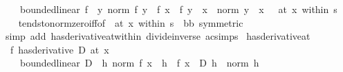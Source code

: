 \begin{isabellebody}
\ \ \ \ bounded{\isacharunderscore}{\kern0pt}linear\ f{\isacharprime}{\kern0pt}\ {\isasymand}\ {\isacharparenleft}{\kern0pt}{\isacharparenleft}{\kern0pt}{\isasymlambda}y{\isachardot}{\kern0pt}\ norm\ {\isacharparenleft}{\kern0pt}{\isacharparenleft}{\kern0pt}f\ y\ {\isacharminus}{\kern0pt}\ f\ x{\isacharparenright}{\kern0pt}\ {\isacharminus}{\kern0pt}\ f{\isacharprime}{\kern0pt}\ {\isacharparenleft}{\kern0pt}y\ {\isacharminus}{\kern0pt}\ x{\isacharparenright}{\kern0pt}{\isacharparenright}{\kern0pt}\ {\isacharslash}{\kern0pt}\ norm\ {\isacharparenleft}{\kern0pt}y\ {\isacharminus}{\kern0pt}\ x{\isacharparenright}{\kern0pt}{\isacharparenright}{\kern0pt}\ {\isasymlonglongrightarrow}\ {}{\isacharparenright}{\kern0pt}\ {\isacharparenleft}{\kern0pt}at\ x\ within\ s{\isacharparenright}{\kern0pt}{\isachardoublequoteclose}\isanewline
%
\isadelimproof
\ \ %
\endisadelimproof
%
\isatagproof
{}\isamarkupfalse%
\ tendsto{\isacharunderscore}{\kern0pt}norm{\isacharunderscore}{\kern0pt}zero{\isacharunderscore}{\kern0pt}iff{\isacharbrackleft}{\kern0pt}of\ {\isacharunderscore}{\kern0pt}\ {\isachardoublequoteopen}at\ x\ within\ s{\isachardoublequoteclose}{\isacharcomma}{\kern0pt}\ \ {\isacharprime}{\kern0pt}b{\isacharequal}{\kern0pt}{\isachardoublequoteopen}{\isacharprime}{\kern0pt}b{\isachardoublequoteclose}{\isacharcomma}{\kern0pt}\ symmetric{\isacharbrackright}{\kern0pt}\isanewline
\ \ \isamarkupfalse%
\ {\isacharparenleft}{\kern0pt}simp\ add{\isacharcolon}{\kern0pt}\ has{\isacharunderscore}{\kern0pt}derivative{\isacharunderscore}{\kern0pt}at{\isacharunderscore}{\kern0pt}within\ divide{\isacharunderscore}{\kern0pt}inverse\ ac{\isacharunderscore}{\kern0pt}simps{\isacharparenright}{\kern0pt}%
\endisatagproof
{\isafoldproof}%
%
\isadelimproof
\isanewline
%
\endisadelimproof
\isanewline
{}\isamarkupfalse%
\ has{\isacharunderscore}{\kern0pt}derivative{\isacharunderscore}{\kern0pt}at{\isacharcolon}{\kern0pt}\isanewline
\ \ {\isachardoublequoteopen}{\isacharparenleft}{\kern0pt}f\ has{\isacharunderscore}{\kern0pt}derivative\ D{\isacharparenright}{\kern0pt}\ {\isacharparenleft}{\kern0pt}at\ x{\isacharparenright}{\kern0pt}\ {\isasymlongleftrightarrow}\isanewline
\ \ \ \ {\isacharparenleft}{\kern0pt}bounded{\isacharunderscore}{\kern0pt}linear\ D\ {\isasymand}\ {\isacharparenleft}{\kern0pt}{\isasymlambda}h{\isachardot}{\kern0pt}\ norm\ {\isacharparenleft}{\kern0pt}f\ {\isacharparenleft}{\kern0pt}x\ {\isacharplus}{\kern0pt}\ h{\isacharparenright}{\kern0pt}\ {\isacharminus}{\kern0pt}\ f\ x\ {\isacharminus}{\kern0pt}\ D\ h{\isacharparenright}{\kern0pt}\ {\isacharslash}{\kern0pt}\ norm\ h{\isacharparenright}{\kern0pt}\ {\isasymmidarrow}{}{\isasymrightarrow}\ {}{\isacharparenright}{\kern0pt}{\isachardoublequoteclose}\isanewline

\end{isabellebody}
